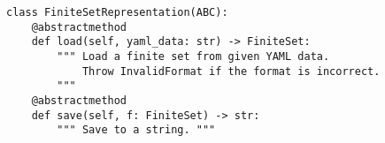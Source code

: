 \begin{verbatim}
class FiniteSetRepresentation(ABC):
    @abstractmethod
    def load(self, yaml_data: str) -> FiniteSet:
        """ Load a finite set from given YAML data.
            Throw InvalidFormat if the format is incorrect.
        """
    @abstractmethod
    def save(self, f: FiniteSet) -> str:
        """ Save to a string. """
\end{verbatim}